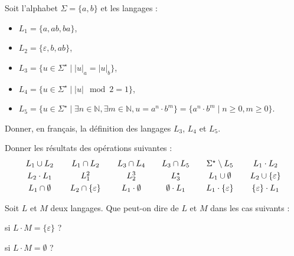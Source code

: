 
\begingroup

\begin{exercice}\label{exo:introduction/languages/languages}

  Soit l'alphabet $\Sigma = \{a, b\}$ et les langages :
  \begin{itemize}
  \item $L_1 = \{a, ab, ba\}$,
  \item $L_2 = \{\varepsilon, b, ab\}$,
  \item $L_3 = \{u \in \Sigma^\star \mid |u|_a = |u|_b \}$,
  \item $L_4 = \{u \in \Sigma^\star \mid |u| \mod 2 = 1\}$,
  \item $L_5 = \{u \in \Sigma^\star \mid \exists n \in \mathbb{N}, \exists m\in \mathbb{N}, u = a^n \cdot b^m \} = \{a^n \cdot b^m \mid n \ge 0, m \ge 0\}$.
  \end{itemize}

  \begin{questions}
  \item Donner, en français, la définition des langages $L_3$, $L_4$ et $L_5$.
  \item Donner les résultats des opérations suivantes :
    $$\begin{array}{c@{\quad\quad}c@{\quad\quad}c@{\quad\quad}c@{\quad\quad}c@{\quad\quad}c}
      L_1 \cup L_2                & 
      L_1 \cap L_2                & 
      L_3 \cap L_4                & 
      L_3 \cap L_5                & 
      \Sigma^\star \setminus L_5   & 
      L_1 \cdot L_2               \\[1mm]
      L_2 \cdot L_1               & 
      L_1^2                       & 
      L_2^3                       & 
      L_3^\star                    &
      L_1 \cup \emptyset          & 
      L_2 \cup \{\varepsilon\}    \\[1mm] 
      L_1 \cap \emptyset          & 
      L_2 \cap \{\varepsilon\}    & 
      L_1 \cdot \emptyset         & 
      \emptyset \cdot L_1         &
      L_1 \cdot\{\varepsilon\}    &
      \{\varepsilon\}\cdot L_1     
    \end{array}$$
  \end{questions}
  Soit $L$ et $M$ deux langages. Que peut-on dire de $L$ et $M$ dans les cas suivants : 
  \begin{questions}
  \item si $L \cdot M = \{\varepsilon\}$ ?
  \item si $L \cdot M = \emptyset$ ?
  \end{questions}

\end{exercice}

